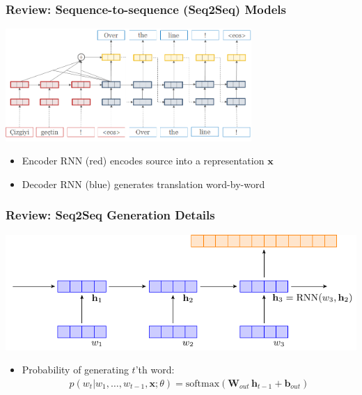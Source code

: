 \documentclass{beamer}
\newcommand{\air}{\vspace{0.25cm}}
\newcommand{\boldx}{\boldsymbol{x}}
\newcommand{\boldy}{\boldsymbol{y}}
\newcommand{\softmax}{\mathrm{softmax}}
\begin{document}
\begin{frame}[t]
\frametitle{Review: Sequence-to-sequence (Seq2Seq) Models}

    \begin{center}
      \includegraphics[width=0.7\textwidth]{simple-attn}
    \end{center}

\air
\air    
\begin{itemize}
\item Encoder RNN (red) encodes source into a representation $\boldx$
\air
\item Decoder RNN (blue) generates translation word-by-word
\end{itemize}
\end{frame}

\begin{frame}
\frametitle{Review: Seq2Seq Generation Details}
\begin{center}
\includegraphics[scale=0.8]{rnntikzpicz/rnnlm}
\end{center}

\begin{itemize}

\item Probability of generating $t$'th word: 
\begin{align*}
p(w_t | w_1, \ldots, w_{t-1}, \boldx ; \theta) = \softmax(\mathbf{W}_{out} \, \mathbf{h}_{t-1} + \mathbf{b}_{out})
\end{align*}
\end{itemize}
\end{frame}

\end{document}
